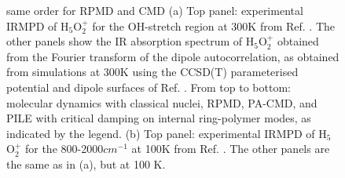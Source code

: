 \documentclass[aps,prb,superscriptaddress,amsmath,amssymb,showpacs,twocolumn]{revtex4}
\begin{document}
\begin{figure}[htbp]
\centering
{}
\caption{
{\color{red} same order for RPMD and CMD}
(a) Top panel: experimental IRMPD of H$_5$O$_2^+$ for the OH-stretch region at 300K from Ref. \cite{YehLee1989}. The other panels show the IR absorption spectrum of H$_5$O$_2^+$ obtained from the Fourier transform of the dipole autocorrelation, as obtained from simulations at 300K using the CCSD(T) parameterised potential and dipole surfaces of Ref. \cite{HuangBraamsBowman2005}. From top to bottom:
 molecular dynamics with classical nuclei, RPMD, PA-CMD, and PILE with critical damping on internal ring-polymer modes, as indicated by the legend. (b) Top panel: experimental IRMPD of H$_5$O$_2^+$ for the 800-2000$cm^{-1}$ at 100K from Ref. \cite{AsmisScience2003}. The other panels are the same as in (a), but at 100 K.}
\label{fig:zundel-highf-lowf}
\end{figure}


\end{document}

